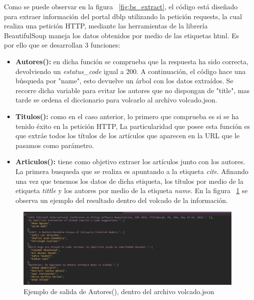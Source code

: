 \documentclass[a4paper, 12pt]{book}
\begin{document}
Como se puede observar en la figura ~\ref{fig:bs_extract}, el código está diseñado para extraer información del portal dblp utilizando la petición requests, la cual realiza una petición HTTP, mediante las herramientas de la librería BeautifulSoup maneja los datos obtenidos por medio de  las etiquetas html. Es por ello que se desarrollan 3 funciones:

\begin{itemize}
    \item \textbf{Autores():}
    en dicha función se comprueba que la respuesta ha sido correcta, devolviendo un \textit{estatus\_code} igual a 200. A continuación, el código hace una búsqueda por "name", esto devuelve un árbol con los datos extraídos.
    Se recorre dicha variable para evitar los autores que no dispongan de "title", mas tarde se ordena el diccionario para volcarlo al archivo volcado.json.
    \item \textbf{Titulos():}
    como en el caso anterior, lo primero que comprueba es si se ha tenido éxito en la petición HTTP, La particularidad que posee esta función es que extráe todos los títulos de los artículos que aparecen en la URL que le pasamos como parámetro.
    \item \textbf{Articulos():}
    tiene como objetivo extraer los artículos junto con los autores. La primera busqueda que se realiza es apuntando a la etiqueta \textit{cite}. Afinando una vez que tenemos los datos de dicha etiqueta, los títulos por medio de la etiqueta \textit{tittle} y los autores por medio de la etiqueta \textit{name}. En la figura ~\ref{fig:bs_ej} se observa un ejemplo del resultado dentro del volcado de la información.
\end{itemize}

\begin{figure}[h]
  \centering
  \includegraphics[width=16cm, keepaspectratio]{img/ej_salida_BS.png}
  \caption{Ejemplo de salida de Autores(), dentro del archivo volcado.json}
  \label{fig:bs_ej}
\end{figure}
\end{document}
